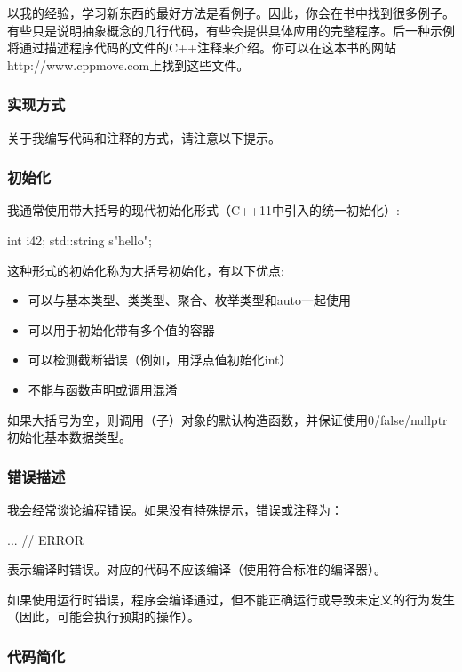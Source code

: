 以我的经验，学习新东西的最好方法是看例子。因此，你会在书中找到很多例子。有些只是说明抽象概念的几行代码，有些会提供具体应用的完整程序。后一种示例将通过描述程序代码的文件的C++注释来介绍。你可以在这本书的网站http://www.cppmove.com上找到这些文件。

\subsubsection{实现方式}

关于我编写代码和注释的方式，请注意以下提示。

\subsubsection{初始化}

我通常使用带大括号的现代初始化形式（C++11中引入的统一初始化）:
\begin{cppcode}
int i{42};
std::string s{"hello"};
\end{cppcode}

这种形式的初始化称为大括号初始化，有以下优点:
\begin{itemize}
	\item 可以与基本类型、类类型、聚合、枚举类型和auto一起使用
	\item 可以用于初始化带有多个值的容器
	\item 可以检测截断错误（例如，用浮点值初始化int）
	\item 不能与函数声明或调用混淆
\end{itemize}

如果大括号为空，则调用（子）对象的默认构造函数，并保证使用0/false/nullptr初始化基本数据类型。

\subsubsection{错误描述}

我会经常谈论编程错误。如果没有特殊提示，错误或注释为：

\begin{cppcode}
... // ERROR
\end{cppcode}

表示编译时错误。对应的代码不应该编译（使用符合标准的编译器）。

如果使用运行时错误，程序会编译通过，但不能正确运行或导致未定义的行为发生（因此，可能会执行预期的操作）。

\subsubsection{代码简化}

